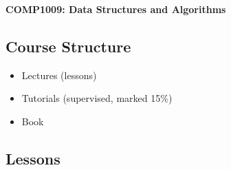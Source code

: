 \documentclass{article}
\begin{document}
\begin{center} \bf \large
  COMP1009: Data Structures and Algorithms
\end{center}
\subsection*{Course Structure}

\begin{itemize}
\item Lectures (lessons)
\item Tutorials (supervised, marked 15\%)
\item Book
\end{itemize}

\subsection*{Lessons}
\end{document}
